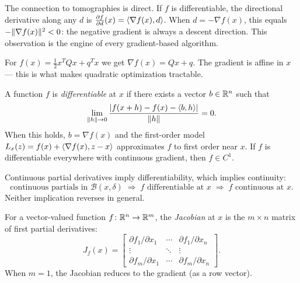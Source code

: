 The connection to tomographies is direct.
If $f$ is differentiable, the directional derivative along any $d$ is $\frac{\partial f}{\partial d}(x) = \langle\nabla f(x), d\rangle$.
When $d = -\nabla f(x)$, this equals $-\lVert\nabla f(x)\rVert^2 < 0$: the negative gradient is always a descent direction.
This observation is the engine of every gradient-based algorithm.

\begin{exm}
	For $f(x) = \frac{1}{2} x^T Q x + q^T x$ we get $\nabla f(x) = Qx + q$.
	The gradient is affine in $x$ --- this is what makes quadratic optimization tractable.
\end{exm}

\begin{defn}[Differentiability]\label{def:differentiable}
	A function $f$ is \textit{differentiable} at $x$ if there exists a vector $b \in \mathbb{R}^n$ such that
	\begin{equation}\label{eq:differentiability}
		\lim_{\lVert h\rVert \to 0} \frac{\lvert f(x + h) - f(x) - \langle b, h\rangle\rvert}{\lVert h\rVert} = 0.
	\end{equation}
	When this holds, $b = \nabla f(x)$ and the first-order model $L_x(z) = f(x) + \langle\nabla f(x), z - x\rangle$ approximates $f$ to first order near $x$.
	If $f$ is differentiable everywhere with continuous gradient, then $f \in C^1$.
\end{defn}

\begin{thm}\label{thm:cont-diff}
	Continuous partial derivatives imply differentiability, which implies continuity:
	\begin{equation}\label{eq:regularity-chain}
		\text{continuous partials in } \mathcal{B}(x, \delta)
		\;\Rightarrow\;
		f \text{ differentiable at } x
		\;\Rightarrow\;
		f \text{ continuous at } x.
	\end{equation}
	Neither implication reverses in general.
\end{thm}

\begin{defn}[Jacobian]\label{def:jacobian}
	For a vector-valued function $f \colon \mathbb{R}^n \to \mathbb{R}^m$, the \textit{Jacobian} at $x$ is the $m \times n$ matrix of first partial derivatives:
	\begin{equation}\label{eq:jacobian}
		J_f(x) = \begin{bmatrix}
			\partial f_1/\partial x_1 & \cdots & \partial f_1/\partial x_n \\
			\vdots & \ddots & \vdots \\
			\partial f_m/\partial x_1 & \cdots & \partial f_m/\partial x_n
		\end{bmatrix}.
	\end{equation}
	When $m = 1$, the Jacobian reduces to the gradient (as a row vector).
\end{defn}

